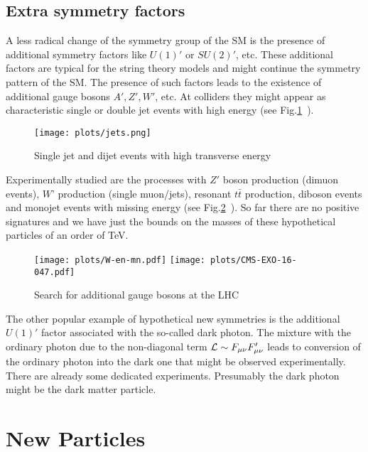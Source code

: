 \documentclass{cernyrep}
\begin{document}
\subsection{Extra symmetry factors}

A less radical change of the symmetry group of the SM is the presence of additional symmetry factors like $U(1)'$ or $SU(2)' $, etc. These additional factors are typical for the string theory models and might continue the symmetry pattern of the SM. The presence of such factors leads to the existence of additional gauge bosons $A',Z',W'$, etc. At colliders they might appear as characteristic single or double jet events with high energy (see Fig.\ref{dijets}~\cite{Rahatlou}).
\begin{figure}[htb]
\begin{center}
\leavevmode
\texttt{[image: plots/jets.png]}
\end{center}
\caption{Single jet and dijet events with high transverse energy}
\label{dijets}
\end{figure}

Experimentally studied are the processes with $Z'$ boson production (dimuon events), $W’$ production (single muon/jets), resonant $t\bar t$ production, diboson events and monojet events with missing energy (see Fig.\ref{extra}~\cite{Search_gauge_bosons}). So far there are no positive signatures and we have just the bounds on the masses of these hypothetical particles of an order of TeV.
\begin{figure}[htb]
\begin{center}
\texttt{[image: plots/W-en-mn.pdf]}
\texttt{[image: plots/CMS-EXO-16-047.pdf]}
\end{center}
\caption{Search for additional gauge bosons at the LHC}
\label{extra}
\end{figure} 

The other popular example of hypothetical new symmetries is the additional $U(1)'$ factor associated  with the so-called dark photon. The mixture with the ordinary photon due to the non-diagonal term ${\cal L} \sim F_{\mu\nu}F_{\mu\nu}'$ leads to conversion of the ordinary photon into the dark one that might be observed experimentally. There are already some dedicated experiments. Presumably the dark photon might be the dark matter particle.


\section{New Particles}
\end{document}
